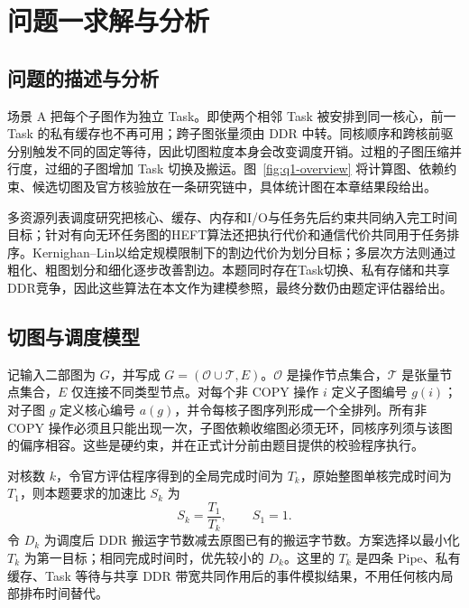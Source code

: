 \section{问题一求解与分析}
\subsection{问题的描述与分析}

场景 A 把每个子图作为独立 Task。即使两个相邻 Task 被安排到同一核心，前一 Task 的私有缓存也不再可用；跨子图张量须由 DDR 中转。同核顺序和跨核前驱分别触发不同的固定等待，因此切图粒度本身会改变调度开销。过粗的子图压缩并行度，过细的子图增加 Task 切换及搬运。图~\ref{fig:q1-overview} 将计算图、依赖约束、候选切图及官方核验放在一条研究链中，具体统计图在本章结果段给出。



多资源列表调度研究把核心、缓存、内存和I/O与任务先后约束共同纳入完工时间目标\cite{perotin2021}；针对有向无环任务图的HEFT算法还把执行代价和通信代价共同用于任务排序\cite{topcuoglu2002}。Kernighan--Lin以给定规模限制下的割边代价为划分目标\cite{kernighan1970}；多层次方法则通过粗化、粗图划分和细化逐步改善割边\cite{karypis1998}。本题同时存在Task切换、私有存储和共享DDR竞争，因此这些算法在本文作为建模参照，最终分数仍由题定评估器给出。

\subsection{切图与调度模型}

记输入二部图为 $G$，并写成 $G=(\mathcal{O}\cup\mathcal{T},E)$。$\mathcal{O}$ 是操作节点集合，$\mathcal{T}$ 是张量节点集合，$E$ 仅连接不同类型节点。对每个非 COPY 操作 $i$ 定义子图编号 $g(i)$；对子图 $g$ 定义核心编号 $a(g)$，并令每核子图序列形成一个全排列。所有非 COPY 操作必须且只能出现一次，子图依赖收缩图必须无环，同核序列须与该图的偏序相容。这些是硬约束，并在正式计分前由题目提供的校验程序执行。

对核数 $k$，令官方评估程序得到的全局完成时间为 $T_k$，原始整图单核完成时间为 $T_1$，则本题要求的加速比 $S_k$ 为
\begin{equation}\label{eq:q1-speedup}
S_k=\frac{T_1}{T_k},\qquad S_1=1.
\end{equation}
令 $D_k$ 为调度后 DDR 搬运字节数减去原图已有的搬运字节数。方案选择以最小化 $T_k$ 为第一目标；相同完成时间时，优先较小的 $D_k$。这里的 $T_k$ 是四条 Pipe、私有缓存、Task 等待与共享 DDR 带宽共同作用后的事件模拟结果，不用任何核内局部排布时间替代。

